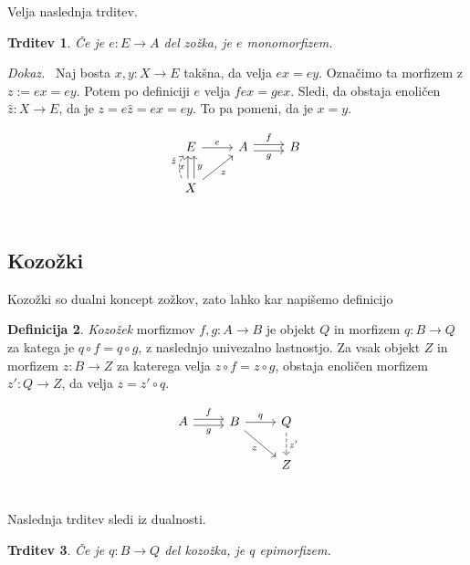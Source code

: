 \documentclass[12pt,a4paper]{book}
\theoremstyle{definition}
\newtheorem{definicija}{Definicija}[chapter]
\theoremstyle{plain}
\newtheorem{trditev}[definicija]{Trditev}
\newenvironment{dokaz}{\emph{Dokaz.}\ }{\hspace{\fill}{$\Box$}}
\theoremstyle{definition}
\theoremstyle{remark}
\begin{document}
Velja naslednja trditev.

\begin{trditev}
Če je $e : E \to A$ del zožka, je $e$ monomorfizem.
\end{trditev}
\begin{dokaz}
Naj bosta $x,y : X \to E$ takšna, da velja $ex = ey$. Označimo ta morfizem z $z := ex = ey$. Potem po definiciji $e$ velja $fex = gex$. Sledi, da obstaja enoličen $\hat{z} : X \to E$, da je $z = e\hat{z} = ex = ey$. To pa pomeni, da je $x = y$.

$$\begin{tikzcd}
E \ar[r, "e"] & A \ar[r, shift left, "f"] \ar[r, shift right, "g"'] & B \\
X \ar[u, bend left, shift left, dashed, "\hat{z}"] \ar[u, shift left, "x"] \ar[u, shift right, "y"'] \ar[ur, "z"'] \\
\end{tikzcd}$$

\end{dokaz}


\subsection{Kozožki}

Kozožki so dualni koncept zožkov, zato lahko kar napišemo definicijo

\begin{definicija}
\textit{Kozožek} morfizmov $f,g:A \to B$ je objekt $Q$ in morfizem $q: B \to Q$ za katega je $q \circ f = q \circ g$, z naslednjo univezalno lastnostjo. Za vsak objekt $Z$ in morfizem $z : B \to Z$ za katerega velja $z \circ f = z \circ g$, obstaja enoličen morfizem $z' : Q \to Z$, da velja $z = z' \circ q$.

$$\begin{tikzcd}
A \ar[r, shift left, "f"] \ar[r, shift right, "g"'] & B \ar[r, "q"] \ar[dr, "z"'] & Q \ar[d, dashed, "z'"] \\
& & Z \\
\end{tikzcd}$$

\end{definicija}

Naslednja trditev sledi iz dualnosti.

\begin{trditev}
Če je $q : B \to Q$ del kozožka, je $q$ epimorfizem.
\end{trditev}
\end{document}

